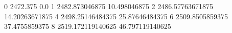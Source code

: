 0 2472.375 0.0
1 2482.873046875 10.498046875
2 2486.57763671875 14.20263671875
4 2498.25146484375 25.87646484375
6 2509.8505859375 37.4755859375
8 2519.172119140625 46.797119140625
